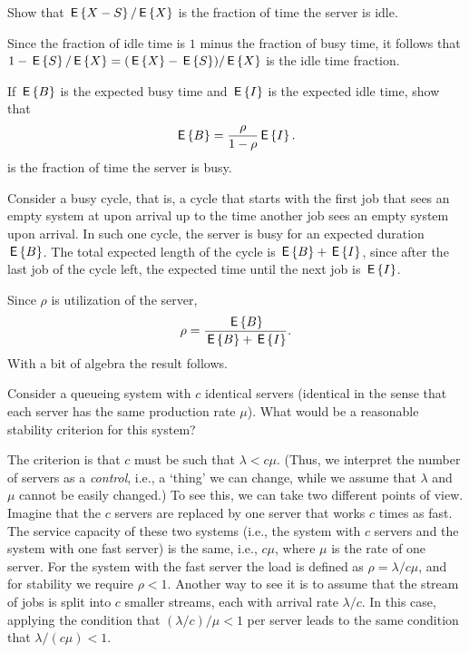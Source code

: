 \begin{question}
 Show that $\,\mathsf{E}\left\{X - S\right\}/\,\mathsf{E}\left\{X\right\}$ is the fraction of time
  the server is idle.
  \begin{solution}
    Since the fraction of idle time is $1$ minus the fraction of busy
    time, it follows that $1-\,\mathsf{E}\left\{S\right\}/ \,\mathsf{E}\left\{X\right\} = (\,\mathsf{E}\left\{X\right\} - \,\mathsf{E}\left\{S\right\})/\,\mathsf{E}\left\{X\right\}$ is the
    idle time fraction.
  \end{solution}
\end{question}

\begin{question}\label{ex:11}
  If $\,\mathsf{E}\left\{B\right\}$ is the expected busy time and $\,\mathsf{E}\left\{I\right\}$ is the expected idle
  time, show that 
\begin{equation*}
  \,\mathsf{E}\left\{B\right\} = \frac{\rho }{1-\rho} \,\mathsf{E}\left\{I\right\}. 
\end{equation*}
 is the fraction of time the  server is busy.
\begin{solution}
  Consider a busy cycle, that is, a cycle that starts with the first
  job that sees an empty system at upon arrival up to the time another
  job sees an empty system upon arrival. In such one cycle, the server
  is busy for an expected duration $\,\mathsf{E}\left\{B\right\}$. The total expected length
  of the cycle is $\,\mathsf{E}\left\{B\right\} + \,\mathsf{E}\left\{I\right\}$, since after the last job of the cycle
  left, the expected time until the next job is $\,\mathsf{E}\left\{I\right\}$.

  Since $\rho$ is utilization of the server,
  \begin{equation*}
\rho = \frac{\,\mathsf{E}\left\{B\right\}}{\,\mathsf{E}\left\{B\right\} + \,\mathsf{E}\left\{I\right\}}.
  \end{equation*}
  With a bit of algebra the result follows.
\end{solution}
\end{question}

\begin{question}
  Consider a queueing system with $c$ identical servers (identical in
  the sense that each server has the same production rate $\mu$). What would be a reasonable stability criterion for this system? 
  \begin{hint}
  \end{hint}
  \begin{solution}
    The criterion is that $c$ must be such that $\lambda <
    c\mu$.
    (Thus, we interpret the number of servers as a \emph{control},
    i.e., a `thing' we can change, while we assume that $\lambda$ and
    $\mu$ cannot be easily changed.) To see this, we can take two
  different points of view.  Imagine that the $c$ servers are replaced
  by one server that works $c$ times as fast. The service capacity of
  these two systems (i.e., the system with $c$ servers and the system
  with one fast server) is the same, i.e., $c\mu$, where $\mu$ is the
  rate of one server. For the system with the fast server the load is
  defined as $\rho =\lambda/c\mu$, and for stability we require
  $\rho<1$.  Another way to see it is to assume that the stream of
  jobs is split into $c$ smaller streams, each with arrival rate
  $\lambda/c$.  In this case, applying the condition that
  $(\lambda/c )/\mu<1$ per server leads to the same condition that
  $\lambda/(c\mu) < 1$.
  \end{solution}
\end{question}

